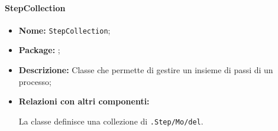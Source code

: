 \paragraph{StepCollection}
\begin{flushleft}
\begin{itemize}
\item \textbf{Nome:} \texttt{StepCollection};
\item \textbf{Package:} \texttt{\collection{}};
\item \textbf{Descrizione:} Classe che permette di gestire un insieme di passi di un processo;
\item \textbf{Relazioni con altri componenti:}
\begin{sloppypar}
La classe definisce una collezione di \texttt{\model{}.Step\fshyp{}Mo\fshyp{}del}.
\end{sloppypar}
\end{itemize}
\end{flushleft}